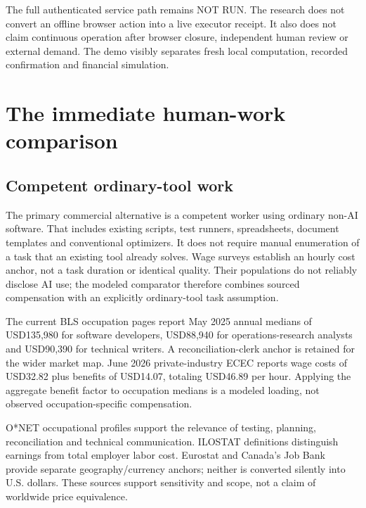 \documentclass[11pt,a4paper]{article}
\newcommand{\nr}{\textsf{NOT RUN}}
\begin{document}
The full authenticated service path remains \nr. The research does not convert an offline browser action into a live executor receipt. It also does not claim continuous operation after browser closure, independent human review or external demand. The demo visibly separates fresh local computation, recorded confirmation and financial simulation.

\section{The immediate human-work comparison}
\label{sec:human}
\subsection{Competent ordinary-tool work}
The primary commercial alternative is a competent worker using ordinary non-AI software. That includes existing scripts, test runners, spreadsheets, document templates and conventional optimizers. It does not require manual enumeration of a task that an existing tool already solves. Wage surveys establish an hourly cost anchor, not a task duration or identical quality. Their populations do not reliably disclose AI use; the modeled comparator therefore combines sourced compensation with an explicitly ordinary-tool task assumption.

The current BLS occupation pages report May 2025 annual medians of USD135,980 for software developers, USD88,940 for operations-research analysts and USD90,390 for technical writers. A reconciliation-clerk anchor is retained for the wider market map. June 2026 private-industry ECEC reports wage costs of USD32.82 plus benefits of USD14.07, totaling USD46.89 per hour. Applying the aggregate benefit factor to occupation medians is a modeled loading, not observed occupation-specific compensation.\citep{bls_software_2025,bls_operations_2025,bls_writer_2025,bls_bookkeeping_2025,bls_ecec_2026q2,bls_oews_method}




O*NET occupational profiles support the relevance of testing, planning, reconciliation and technical communication. ILOSTAT definitions distinguish earnings from total employer labor cost. Eurostat and Canada's Job Bank provide separate geography/currency anchors; neither is converted silently into U.S. dollars. These sources support sensitivity and scope, not a claim of worldwide price equivalence.\citep{onet_software_2026,onet_operations_2026,onet_writer_2026,onet_bookkeeping_2026,ilostat_wages_method,eurostat_labour_2025,jobbank_writer_2024}
\end{document}
